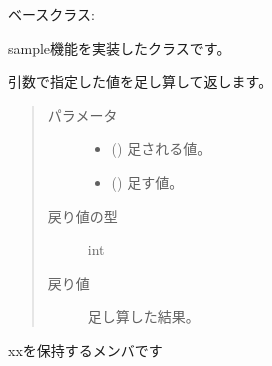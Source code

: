 \documentclass[a4paper,10pt,dvipdfmx]{sphinxmanual}
\begin{document}
\begin{fulllineitems}
\label{\detokenize{camera:camera.camera.Sample}}
\sphinxAtStartPar
ベースクラス: 

\sphinxAtStartPar
sample機能を実装したクラスです。

\begin{fulllineitems}
\label{\detokenize{camera:camera.camera.Sample.add}}
\sphinxAtStartPar
引数で指定した値を足し算して返します。
\begin{quote}\begin{description}
\item[{パラメータ}] \leavevmode\begin{itemize}
\item {} 
\sphinxAtStartPar
{} () \sphinxhyphen{}\sphinxhyphen{} 足される値。

\item {} 
\sphinxAtStartPar
{} () \sphinxhyphen{}\sphinxhyphen{} 足す値。

\end{itemize}

\item[{戻り値の型}] \leavevmode
\sphinxAtStartPar
int

\item[{戻り値}] \leavevmode
\sphinxAtStartPar
足し算した結果。

\end{description}\end{quote}

\end{fulllineitems}


\begin{fulllineitems}
\label{\detokenize{camera:camera.camera.Sample.bar}}
\sphinxAtStartPar
xxを保持するメンバです


\end{fulllineitems}
\end{fulllineitems}
\end{document}
